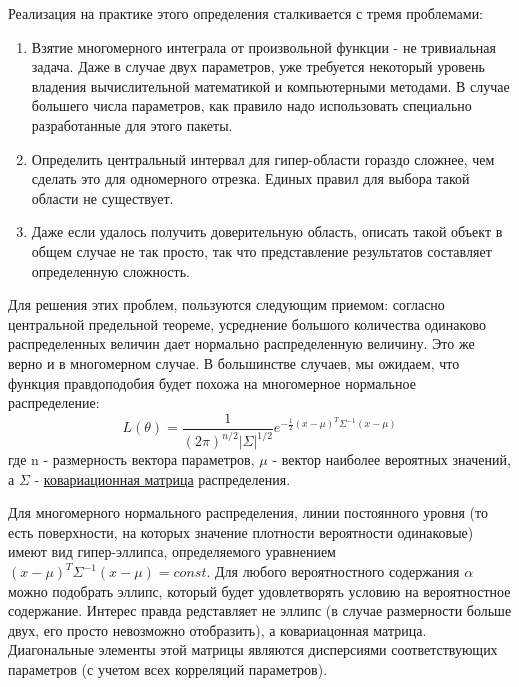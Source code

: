 Реализация на практике этого определения сталкивается с тремя
проблемами:

\begin{enumerate}
\item Взятие многомерного интеграла от произвольной функции - не тривиальная
  задача. Даже в случае двух параметров, уже требуется некоторый уровень
  владения вычислительной математикой и компьютерными методами. В случае
  большего числа параметров, как правило надо использовать специально
  разработанные для этого пакеты.
\item Определить центральный интервал для гипер-области гораздо сложнее, чем
  сделать это для одномерного отрезка. Единых правил для выбора такой
  области не существует.
\item Даже если удалось получить доверительную область, описать такой объект
  в общем случае не так просто, так что представление результатов
  составляет определенную сложность.
\end{enumerate}

Для решения этих проблем, пользуются следующим приемом: согласно
центральной предельной теореме, усреднение большого количества одинаково
распределенных величин дает нормально распределенную величину. Это же
верно и в многомерном случае. В большинстве случаев, мы ожидаем, что
функция правдоподобия будет похожа на многомерное нормальное
распределение: \begin{equation}
    L(\theta) = \frac{1}{(2 \pi)^{n/2}\left|\Sigma\right|^{1/2}} e^{-\frac{1}{2} (x - \mu)^T \Sigma^{-1} (x - \mu)}
\end{equation} где n - размерность вектора параметров, $\mu$ - вектор
наиболее вероятных значений, а $\Sigma$ -
\href{https://ru.wikipedia.org/wiki/\%D0\%9A\%D0\%BE\%D0\%B2\%D0\%B0\%D1\%80\%D0\%B8\%D0\%B0\%D1\%86\%D0\%B8\%D0\%BE\%D0\%BD\%D0\%BD\%D0\%B0\%D1\%8F_\%D0\%BC\%D0\%B0\%D1\%82\%D1\%80\%D0\%B8\%D1\%86\%D0\%B0}{ковариационная
матрица} распределения.

Для многомерного нормального распределения, линии постоянного уровня (то
есть поверхности, на которых значение плотности вероятности одинаковые)
имеют вид гипер-эллипса, определяемого уравнением
$(x - \mu)^T \Sigma^{-1} (x - \mu) = const$. Для любого вероятностного
содержания $\alpha$ можно подобрать эллипс, который будет
удовлетворять условию на вероятностное содержание. Интерес правда
редставляет не эллипс (в случае размерности больше двух, его просто
невозможно отобразить), а ковариацонная матрица. Диагональные элементы
этой матрицы являются дисперсиями соответствующих параметров (с учетом
всех корреляций параметров).


